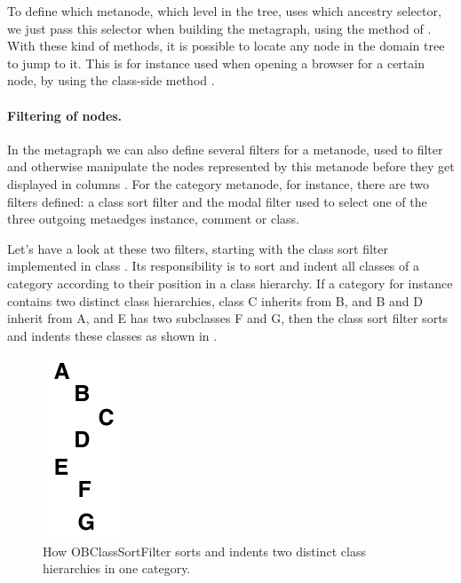 \documentclass[a4paper,10pt,twoside]{book}
\begin{document}
To define which metanode, \ie which level in the tree, uses which ancestry selector, we just pass this selector when building the metagraph, using the method  of .
With these kind of methods, it is possible to locate any node in the domain tree to \eg jump to it. This is for instance used when opening a browser for a certain node, \eg by using the  class-side method .

\paragraph{Filtering of nodes.}

In the metagraph we can also define several filters for a metanode, used to filter and otherwise manipulate the nodes represented by this metanode before they get displayed in columns . For the category metanode, for instance, there are two filters defined: a class sort filter and the modal filter used to select one of the three outgoing metaedges instance, comment or class. 

Let's have a look at these two filters, starting with the class sort filter implemented in class . Its responsibility is to sort and indent all classes of a category according to their position in a class hierarchy. If a category for instance contains two distinct class hierarchies, \eg class C inherits from B, and B and D inherit from A, and E has two subclasses F and G, then the class sort filter sorts and indents these classes as shown in .

\begin{figure}[!ht]
\begin{center}
\includegraphics[scale=1]{classSortFilter.pdf}
\caption{How OBClassSortFilter sorts and indents two distinct class hierarchies in one category.} 
\end{center}
\end{figure}
\end{document}
